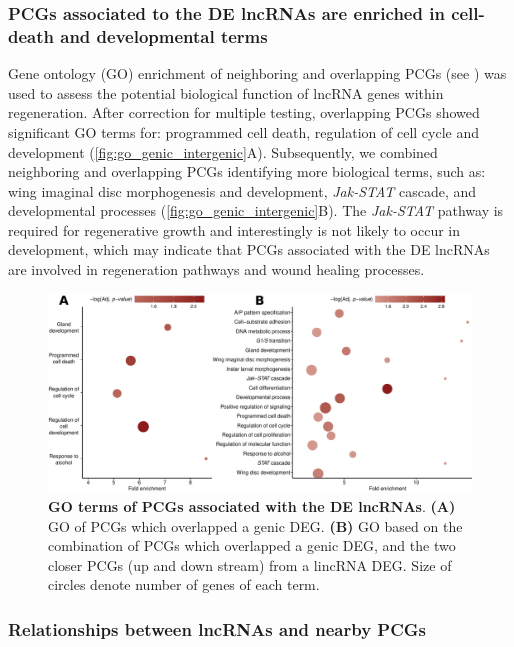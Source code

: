 \subsubsection{PCGs associated to the DE lncRNAs are enriched in cell-death and developmental terms}
\label{sec:go-lncRNAs}

Gene ontology (GO) enrichment of neighboring and overlapping PCGs (see ) was used to assess the potential biological function of lncRNA genes within regeneration. After correction for multiple testing, overlapping PCGs showed significant GO terms for: programmed cell death, regulation of cell cycle and development (\autoref{fig:go_genic_intergenic}A). Subsequently, we combined neighboring and overlapping PCGs identifying more biological terms, such as: wing imaginal disc morphogenesis and development, \textit{Jak-STAT} cascade, and developmental processes (\autoref{fig:go_genic_intergenic}B). The \textit{Jak-STAT} pathway is required for regenerative growth and interestingly is not likely to occur in development, which may indicate that PCGs associated with the DE lncRNAs are involved in regeneration pathways and wound healing processes.\autocite{katsuyama_2015,santabarbara_2015}

\begin{figure}[ht!]
  \centering
  \includegraphics[scale=0.65]{plots/results/dme/go.genic.intergenic.pdf}
  \caption[GO terms of PCGs associated with the DE lncRNAs]{\textbf{GO terms of PCGs associated with the DE lncRNAs}. \textbf{(A)} GO of PCGs which overlapped a genic DEG. \textbf{(B)} GO based on the combination of PCGs which overlapped a genic DEG, and the two closer PCGs (up and down stream) from a lincRNA DEG. Size of circles denote number of genes of each term.}
  \label{fig:go_genic_intergenic}
\end{figure}

\subsubsection{Relationships between lncRNAs and nearby PCGs}
\label{sec:lncRNA-PC-correlation}

